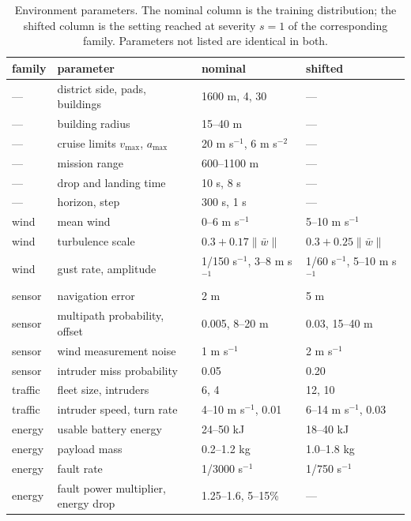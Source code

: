 \begin{table}[tb]
\centering
\caption{Environment parameters. The nominal column is the training distribution; the shifted column is the setting reached at severity $s=1$ of the corresponding family. Parameters not listed are identical in both.}
\label{tab:env}
\small
\begin{tabular}{llll}
\toprule
family & parameter & nominal & shifted \\
\midrule
--- & district side, pads, buildings & 1600 m, 4, 30 & --- \\
--- & building radius & 15--40 m & --- \\
--- & cruise limits $v_{\max}$, $a_{\max}$ & 20 m s$^{-1}$, 6 m s$^{-2}$ & --- \\
--- & mission range & 600--1100 m & --- \\
--- & drop and landing time & 10 s, 8 s & --- \\
--- & horizon, step & 300 s, 1 s & --- \\
\addlinespace[2pt]
wind & mean wind & 0--6 m s$^{-1}$ & 5--10 m s$^{-1}$ \\
wind & turbulence scale & $0.3+0.17\lVert\bar w\rVert$ & $0.3+0.25\lVert\bar w\rVert$ \\
wind & gust rate, amplitude & 1/150 s$^{-1}$, 3--8 m s$^{-1}$ & 1/60 s$^{-1}$, 5--10 m s$^{-1}$ \\
\addlinespace[2pt]
sensor & navigation error & 2 m & 5 m \\
sensor & multipath probability, offset & 0.005, 8--20 m & 0.03, 15--40 m \\
sensor & wind measurement noise & 1 m s$^{-1}$ & 2 m s$^{-1}$ \\
sensor & intruder miss probability & 0.05 & 0.20 \\
\addlinespace[2pt]
traffic & fleet size, intruders & 6, 4 & 12, 10 \\
traffic & intruder speed, turn rate & 4--10 m s$^{-1}$, 0.01 & 6--14 m s$^{-1}$, 0.03 \\
\addlinespace[2pt]
energy & usable battery energy & 24--50 kJ & 18--40 kJ \\
energy & payload mass & 0.2--1.2 kg & 1.0--1.8 kg \\
energy & fault rate & 1/3000 s$^{-1}$ & 1/750 s$^{-1}$ \\
energy & fault power multiplier, energy drop & 1.25--1.6, 5--15\% & --- \\
\bottomrule
\end{tabular}
\end{table}
